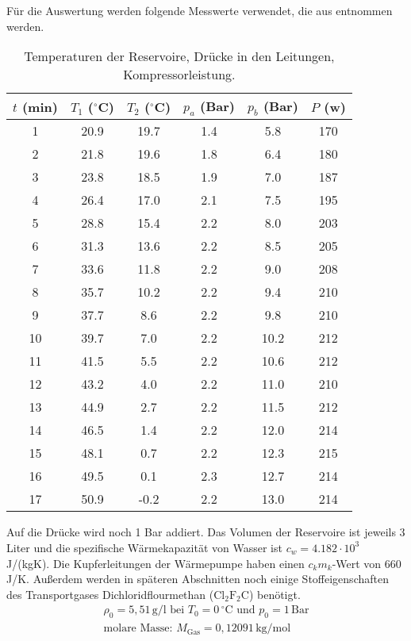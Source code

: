 Für die Auswertung werden folgende Messwerte verwendet, die aus \cite{AnleitungV206} entnommen werden.
\begin{table}
  \centering
  \caption{Temperaturen der Reservoire, Drücke in den Leitungen, Kompressorleistung.}
  \label{tab:Messdaten}
  \begin{tabular}{c c c c c c}
    \toprule
    $t$ (min) & $T_1$ ($^\circ$C) & $T_2$ ($^\circ$C) & $p_a$ (Bar) & $p_b$ (Bar) & $P$ (w) \\
    \midrule
     1 & 20.9 & 19.7 & 1.4 &  5.8 & 170 \\
     2 & 21.8 & 19.6 & 1.8 &  6.4 & 180 \\
     3 & 23.8 & 18.5 & 1.9 &  7.0 & 187 \\
     4 & 26.4 & 17.0 & 2.1 &  7.5 & 195 \\
     5 & 28.8 & 15.4 & 2.2 &  8.0 & 203 \\
     6 & 31.3 & 13.6 & 2.2 &  8.5 & 205 \\
     7 & 33.6 & 11.8 & 2.2 &  9.0 & 208 \\
     8 & 35.7 & 10.2 & 2.2 &  9.4 & 210 \\
     9 & 37.7 &  8.6 & 2.2 &  9.8 & 210 \\
    10 & 39.7 &  7.0 & 2.2 & 10.2 & 212 \\
    11 & 41.5 &  5.5 & 2.2 & 10.6 & 212 \\
    12 & 43.2 &  4.0 & 2.2 & 11.0 & 210 \\
    13 & 44.9 &  2.7 & 2.2 & 11.5 & 212 \\
    14 & 46.5 &  1.4 & 2.2 & 12.0 & 214 \\
    15 & 48.1 &  0.7 & 2.2 & 12.3 & 215 \\
    16 & 49.5 &  0.1 & 2.3 & 12.7 & 214 \\
    17 & 50.9 & -0.2 & 2.2 & 13.0 & 214 \\
    \bottomrule
  \end{tabular}
\end{table}
Auf die Drücke wird noch 1 Bar addiert.
Das Volumen der Reservoire ist jeweils 3 Liter und die spezifische Wärmekapazität von Wasser ist $ c_w =4.182 \cdot 10^3$ J/(kgK).
Die Kupferleitungen der Wärmepumpe haben einen $c_k m_k$-Wert von 660 J/K.
Außerdem werden in späteren Abschnitten noch einige Stoffeigenschaften des Transportgases Dichloridflourmethan ($\text{Cl}_2\text{F}_2\text{C}$) benötigt.
\begin{align*}
  \rho_0 = 5,51 \, \text{g/l bei } T_0 = 0 \, ^\circ\text{C und } p_0 = 1 \, \text{Bar} \\
  \text{molare Masse: } M_{\text{Gas}} = 0,12091 \, \text{kg/mol}
\end{align*}
\FloatBarrier

